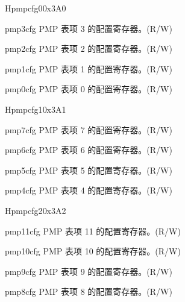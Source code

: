 \begin{register}{H}{pmpcfg0}{0x3A0}
\label{regdesc:pmpcfg0}%
%
%
%
%
\regnewline%
\begin{regdesc}
\begin{reglist}
\label{fielddesc:pmp3cfg}\item [pmp3cfg] PMP 表项 3 的配置寄存器。(R/W)
\label{fielddesc:pmp2cfg}\item [pmp2cfg] PMP 表项 2 的配置寄存器。(R/W)
\label{fielddesc:pmp1cfg}\item [pmp1cfg] PMP 表项 1 的配置寄存器。(R/W)
\label{fielddesc:pmp0cfg}\item [pmp0cfg] PMP 表项 0 的配置寄存器。(R/W)
\end{reglist}
\end{regdesc}
\end{register}

\begin{register}{H}{pmpcfg1}{0x3A1}
\label{regdesc:pmpcfg1}%
%
%
%
%
\regnewline%
\begin{regdesc}
\begin{reglist}
\label{fielddesc:pmp7cfg}\item [pmp7cfg] PMP 表项 7 的配置寄存器。(R/W)
\label{fielddesc:pmp6cfg}\item [pmp6cfg] PMP 表项 6 的配置寄存器。(R/W)
\label{fielddesc:pmp5cfg}\item [pmp5cfg] PMP 表项 5 的配置寄存器。(R/W)
\label{fielddesc:pmp4cfg}\item [pmp4cfg] PMP 表项 4 的配置寄存器。(R/W)
\end{reglist}
\end{regdesc}
\end{register}

\begin{register}{H}{pmpcfg2}{0x3A2}
\label{regdesc:pmpcfg2}%
%
%
%
%
\regnewline%
\begin{regdesc}
\begin{reglist}
\label{fielddesc:pmp11cfg}\item [pmp11cfg] PMP 表项 11 的配置寄存器。(R/W)
\label{fielddesc:pmp10cfg}\item [pmp10cfg] PMP 表项 10 的配置寄存器。(R/W)
\label{fielddesc:pmp9cfg}\item [pmp9cfg] PMP 表项 9 的配置寄存器。(R/W)
\label{fielddesc:pmp8cfg}\item [pmp8cfg] PMP 表项 8 的配置寄存器。(R/W)
\end{reglist}
\end{regdesc}
\end{register}

